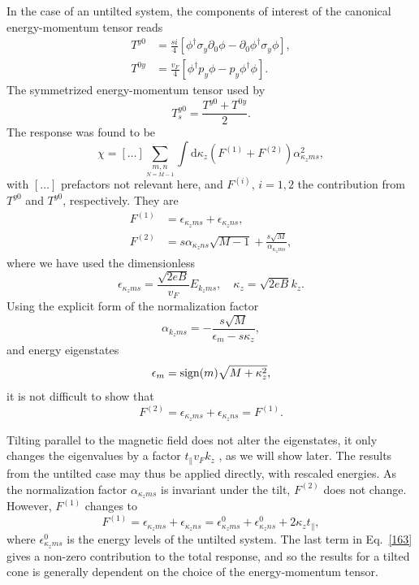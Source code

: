 In the case of an untilted system, the components of interest of the canonical energy-momentum tensor reads
\begin{subequations}
\begin{align}
  T^{y 0} &= \frac{s i}{4}
  \left[
  \phi^{\dagger} \sigma_y \partial_{0} \phi - \partial_0 \phi^{\dagger} \sigma_y \phi
  \right],\\
  T^{0 y} &= \frac{v_F}{4}
  \left[
  \phi^{\dagger} p_y \phi - p_y \phi^{\dagger} \phi
  \right].
\end{align}
\end{subequations}
The symmetrized energy-momentum tensor used by \textcite{arjonaFingerprintsConformalAnomaly2019}
\begin{equation}
  T_s^{y 0} = \frac{T^{y 0} + T^{0 y}}{2}.
\end{equation}
The response was found to be
\begin{equation}
  \chi = [\dots] \sum\limits_{\underset{N=M-1}{m,n}}^{} \int \mathrm{d} \kappa_z (F^{(1)} + F^{(2)}) \alpha_{\kappa_z m s}^2,
\end{equation}
with \( [\dots] \) prefactors not relevant here, and \( F^{(i)},\, i=1,2 \) the contribution from \( T^{y0} \) and \( T^{y 0} \), respectively.
They are
\begin{align}
  F^{(1)} &= \epsilon_{\kappa_z m s} + \epsilon_{\kappa_z n s},\\
  F^{(2)} &= s \alpha_{\kappa_z n s} \sqrt{M-1} + \frac{s \sqrt{M}}{\alpha_{\kappa_z m s}},
\end{align}
where we have used the dimensionless
\[
  \epsilon_{\kappa_z m s} = \frac{\sqrt{2eB}}{v_{F}} E_{k_z m s}, \quad \kappa_z = \sqrt{2 e B} k_z.
\]
Using the explicit form of the normalization factor
\[
  \alpha_{k_z m s} = - \frac{s \sqrt{M}}{\epsilon_{m} - s \kappa_z},
\]
and energy eigenstates
\[
  \epsilon_m = \operatorname{sign} (m) \sqrt{M + \kappa_{z}^2},
\]
it is not difficult to show that
\begin{equation}
  F^{(2)} = \epsilon_{\kappa_z m s} + \epsilon_{\kappa_z n s} = F^{(1)}.
\end{equation}

Tilting parallel to the magnetic field does not alter the eigenstates, it only changes the eigenvalues by a factor \( t_{\parallel} v_F k_z \) \cites{yuPredictedUnusualMagnetoresponse2016,tchoumakovMagneticFieldInducedRelativisticProperties2016}, as we will show later.
The results from the untilted case may thus be applied directly, with rescaled energies.
As the normalization factor \( \alpha_{\kappa_z m s} \) is invariant under the tilt, \( F^{(2)} \) does not change.
However, \( F^{(1)} \) changes to
\begin{equation}
  \label{eq:163}
  F^{(1)} = \epsilon_{\kappa_z m s} + \epsilon_{\kappa_z n s} = \epsilon^0_{\kappa_z m s} + \epsilon^0_{\kappa_z n s} + 2 \kappa_z t_{\parallel},
\end{equation}
where \( \epsilon^0_{\kappa_z m s} \) is the energy levels of the untilted system.
The last term in Eq.~\eqref{163} gives a non-zero contribution to the total response, and so the results for a tilted cone is generally dependent on the choice of the energy-momentum tensor.


